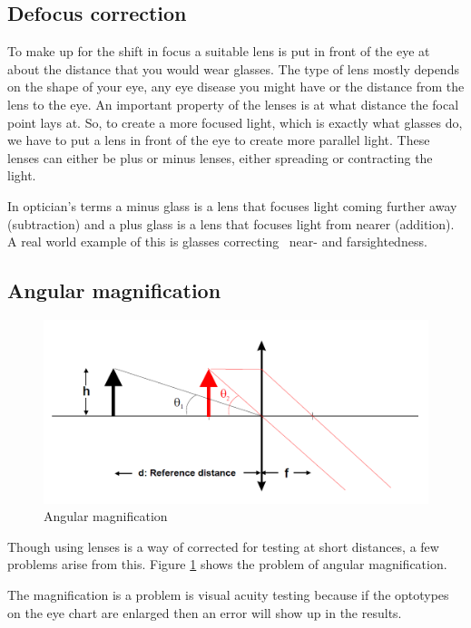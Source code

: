\documentclass[12pt,a4paper,notitlepage]{report}
\begin{document}
\subsection{Defocus correction}
To make up for the shift in focus a suitable lens is put in front of the eye at about the distance that you would wear glasses. The type of lens mostly depends on the shape of your eye, any eye disease you might have or the distance from the lens to the eye. An important property of the lenses is at what distance the focal point lays at. So, to create a more focused light, which is exactly what glasses do, we have to put a lens in front of the eye to create more parallel light. These lenses can either be plus or minus lenses, either spreading or contracting the light.

In optician's terms a minus glass is a lens that focuses light coming further away (subtraction) and a plus glass is a lens that focuses light from nearer (addition). A real world example of this is glasses correcting ~near- and farsightedness.

\subsection{Angular magnification}
\begin{figure}[h]
\centering
\includegraphics[width=120mm]{images/Angular_magnification.png}
\caption{Angular magnification\label{angular}}
\end{figure}

Though using lenses is a way of corrected for testing at short distances, a few problems arise from this. Figure \ref{angular} shows the problem of angular magnification. 

The magnification is a problem is visual acuity testing because if the optotypes on the eye chart are enlarged then an error will show up in the results.
\end{document}
